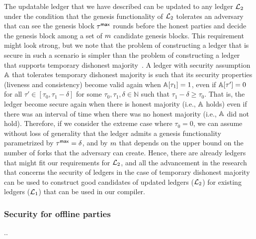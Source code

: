 The updatable ledger that we have described can be updated to any ledger $\mathcal{L}_2$ under the condition 
that the genesis functionality of $\mathcal{L}_2$ tolerates an adversary that can see the genesis block
$\tau^\mathsf{max}$ rounds before the honest parties and decide the genesis block among a set of $m$ candidate 
genesis blocks. This requirement might look strong, but we note that the problem of constructing a ledger 
that is secure in such a scenario is simpler than the problem of constructing a ledger that supports temporary dishonest majority~\cite{FC:AKWW19}. A ledger with security assumption $\mathbb{A}$ that tolerates temporary dishonest majority is such that its security properties (liveness and consistency) become valid again 
when $\mathbb{A}[\tau_1]=1$, even if $\mathbb{A}[\tau']=0$ for all $\tau'\in[\tau_0, \tau_1-\delta]$
for some $\tau_0,\tau_1,\delta \in\mathbb{N}$ such that  $\tau_1-\delta\geq \tau_0$. That is,
the ledger become secure again when there is honest majority (i.e., $\mathbb{A}$ holds) even if there was an interval of time when there was no honest majority (i.e., $\mathbb{A}$ did not hold).
Therefore, if we consider the extreme case where $\tau_0=0$, we can assume without loss of generality 
that the ledger admits a genesis functionality parametrized by $\tau^\mathsf{max}=\delta$, and by $m$
that depends on the upper bound on the number of forks that the adversary can create. 
Hence, there are already ledgers that might fit our requirements for $\mathcal{L}_2$, and all the advancement in the 
research that concerns the security of ledgers in the case of temporary dishonest majority can be used 
to construct good candidates of updated ledgers ($\mathcal{L}_2$) for existing ledgers ($\mathcal{L}_1$) that can be used in our compiler.



\subsubsection{Security for offline parties}\label{se:peg}

..











